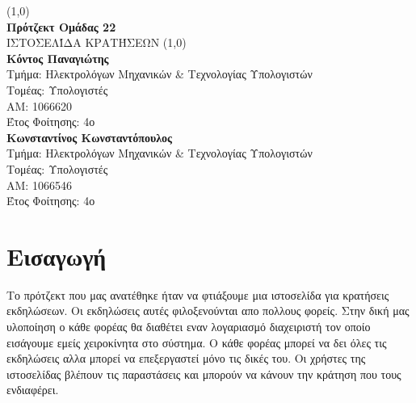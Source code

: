 \documentclass{acmart}
\begin{document}
       \begin{titlepage}
              \begin{center}
              \vspace*{1cm}

              \line(1,0){\textwidth}\\
              \textbf{Πρότζεκτ Ομάδας 22}\\
              \vspace{0.5cm}
              ΙΣΤΟΣΕΛΊΔΑ ΚΡΑΤΉΣΕΩΝ
              \vspace{1.5cm}
              \line(1,0){\textwidth}\\
              \textbf{Κόντος Παναγιώτης}\\
              Τμήμα: Ηλεκτρολόγων Μηχανικών \& Τεχνολογίας Υπολογιστών\\
              Τομέας: Υπολογιστές\\
              ΑΜ: 1066620\\
              Έτος Φοίτησης: 4ο\\
              \vspace{0.8cm}
              \textbf{Κωνσταντίνος Κωνσταντόπουλος}\\
                     Τμήμα: Ηλεκτρολόγων Μηχανικών \& Τεχνολογίας Υπολογιστών\\
              Τομέας: Υπολογιστές\\
              ΑΜ: 1066546\\
              Έτος Φοίτησης: 4ο\\

              \vspace{0.8cm}


              
              \end{center}
       \end{titlepage}
\tableofcontents
\newpage
\section{Εισαγωγή}
Το πρότζεκτ που μας ανατέθηκε ήταν να φτιάξουμε μια ιστοσελίδα για κρατήσεις εκδηλώσεων. Οι εκδηλώσεις αυτές φιλοξενούνται απο πολλους φορείς. Στην δική μας υλοποίηση ο κάθε φορέας θα διαθέτει εναν λογαριασμό διαχειριστή τον οποίο εισάγουμε εμείς χειροκίνητα στο σύστημα. Ο κάθε φορέας μπορεί να δει όλες τις εκδηλώσεις αλλα μπορεί να επεξεργαστεί μόνο τις δικές του. Οι χρήστες της ιστοσελίδας βλέπουν τις παραστάσεις και μπορούν να κάνουν την κράτηση που τους ενδιαφέρει.  
\end{document}
